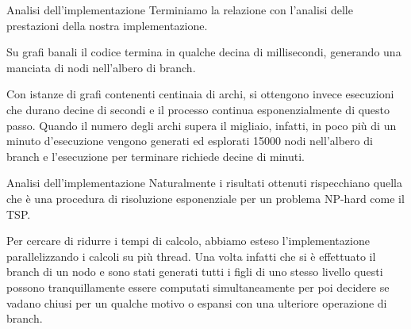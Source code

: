 \documentclass[10pt]{beamer}
\begin{document}
\begin{frame}{Analisi dell'implementazione}
    Terminiamo la relazione con l'analisi delle prestazioni della nostra implementazione.
    
    Su grafi banali il codice termina in qualche decina di millisecondi, generando una manciata di nodi nell'albero di branch.
    
    Con istanze di grafi contenenti centinaia di archi, si ottengono invece esecuzioni che durano decine di secondi e il processo continua esponenzialmente di questo passo. Quando il numero degli archi supera il migliaio, infatti, in poco più di un minuto d'esecuzione vengono generati ed esplorati 15000 nodi nell'albero di branch e l'esecuzione per terminare richiede decine di minuti.
\end{frame}

\begin{frame}{Analisi dell'implementazione}
    Naturalmente i risultati ottenuti rispecchiano quella che è una procedura di risoluzione esponenziale per un problema NP-hard come il TSP.
    
    Per cercare di ridurre i tempi di calcolo, abbiamo esteso l'implementazione parallelizzando i calcoli su più thread. Una volta infatti che si è effettuato il branch di un nodo e sono stati generati tutti i figli di uno stesso livello questi possono tranquillamente essere computati simultaneamente per poi decidere se vadano chiusi per un qualche motivo o espansi con una ulteriore operazione di branch.
\end{frame}
\end{document}
